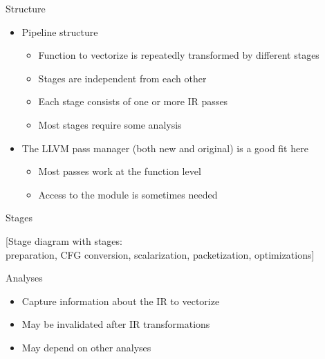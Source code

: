\begin{frame}{Structure}

\begin{itemize}
    \item Pipeline structure
    \begin{itemize}
        \item Function to vectorize is repeatedly transformed by different stages
        \item Stages are independent from each other
        \item Each stage consists of one or more IR passes
        \item Most stages require some analysis
    \end{itemize}
    
    \item The LLVM pass manager (both new and original) is a good fit here
    \begin{itemize}
        \item Most passes work at the function level
        \item Access to the module is sometimes needed
    \end{itemize}
\end{itemize}

\end{frame}


\begin{frame}[c]{Stages}

[Stage diagram with stages:\\ preparation, CFG conversion, scalarization, packetization, optimizations]

\end{frame}


\begin{frame}{Analyses}

\begin{itemize}
    \item Capture information about the IR to vectorize
    \item May be invalidated after IR transformations
    \item May depend on other analyses
\end{itemize}

\end{frame}

